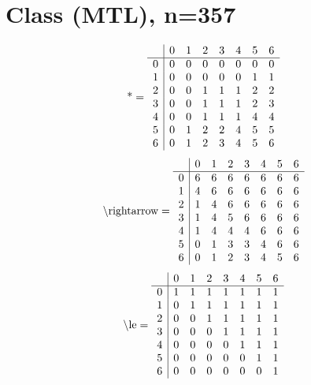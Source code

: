 \documentclass[11pt]{article}
\begin{document}
\section{Class (MTL), n=357}
\[\text{*} = 
\begin{array}{r | r r r r r r r}
 & 0 & 1 & 2 & 3 & 4 & 5 & 6 \\ \hline
0 & 0 & 0 & 0 & 0 & 0 & 0 & 0 \\
1 & 0 & 0 & 0 & 0 & 0 & 1 & 1 \\
2 & 0 & 0 & 1 & 1 & 1 & 2 & 2 \\
3 & 0 & 0 & 1 & 1 & 1 & 2 & 3 \\
4 & 0 & 0 & 1 & 1 & 1 & 4 & 4 \\
5 & 0 & 1 & 2 & 2 & 4 & 5 & 5 \\
6 & 0 & 1 & 2 & 3 & 4 & 5 & 6 \\
\end{array}
\]
\[\text{\textbackslash rightarrow} = 
\begin{array}{r | r r r r r r r}
 & 0 & 1 & 2 & 3 & 4 & 5 & 6 \\ \hline
0 & 6 & 6 & 6 & 6 & 6 & 6 & 6 \\
1 & 4 & 6 & 6 & 6 & 6 & 6 & 6 \\
2 & 1 & 4 & 6 & 6 & 6 & 6 & 6 \\
3 & 1 & 4 & 5 & 6 & 6 & 6 & 6 \\
4 & 1 & 4 & 4 & 4 & 6 & 6 & 6 \\
5 & 0 & 1 & 3 & 3 & 4 & 6 & 6 \\
6 & 0 & 1 & 2 & 3 & 4 & 5 & 6 \\
\end{array}
\]
\[\text{\textbackslash le} = 
\begin{array}{r | r r r r r r r}
 & 0 & 1 & 2 & 3 & 4 & 5 & 6 \\ \hline
0 & 1 & 1 & 1 & 1 & 1 & 1 & 1 \\
1 & 0 & 1 & 1 & 1 & 1 & 1 & 1 \\
2 & 0 & 0 & 1 & 1 & 1 & 1 & 1 \\
3 & 0 & 0 & 0 & 1 & 1 & 1 & 1 \\
4 & 0 & 0 & 0 & 0 & 1 & 1 & 1 \\
5 & 0 & 0 & 0 & 0 & 0 & 1 & 1 \\
6 & 0 & 0 & 0 & 0 & 0 & 0 & 1 \\
\end{array}
\]
\end{document}
